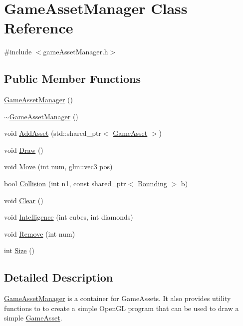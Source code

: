 \hypertarget{classGameAssetManager}{\section{Game\-Asset\-Manager Class Reference}
\label{classGameAssetManager}
}


{\ttfamily \#include $<$game\-Asset\-Manager.\-h$>$}

\subsection*{Public Member Functions}
\begin{DoxyCompactItemize}
\item 
\hyperlink{classGameAssetManager_a84d0445928649e0d1e0f8e31ee137b17}{Game\-Asset\-Manager} ()
\item 
\hyperlink{classGameAssetManager_a1270bd61ecbcca563f079803e40c9b77}{$\sim$\-Game\-Asset\-Manager} ()
\item 
void \hyperlink{classGameAssetManager_ad3de8ff00d55ba04728b1de8213b2349}{Add\-Asset} (std\-::shared\-\_\-ptr$<$ \hyperlink{classGameAsset}{Game\-Asset} $>$)
\item 
void \hyperlink{classGameAssetManager_a32837132bd70a9a9ed537323c2d3d886}{Draw} ()
\item 
void \hyperlink{classGameAssetManager_ac9dfdde0628476af5b77b60d461041f1}{Move} (int num, glm\-::vec3 pos)
\item 
bool \hyperlink{classGameAssetManager_a79e400319fb874ae0301a8b0e7926737}{Collision} (int n1, const shared\-\_\-ptr$<$ \hyperlink{classBounding}{Bounding} $>$ b)
\item 
void \hyperlink{classGameAssetManager_a9c2f2b3bae3f4752be16e850e9c45136}{Clear} ()
\item 
void \hyperlink{classGameAssetManager_ae7e76a05368ce0887ed72a9ee39329eb}{Intelligence} (int cubes, int diamonds)
\item 
void \hyperlink{classGameAssetManager_a2c87c005095eadb1669428dfe3a16423}{Remove} (int num)
\item 
int \hyperlink{classGameAssetManager_ae0e0f79e6dbe422ce5d3c4fd5e20d032}{Size} ()
\end{DoxyCompactItemize}


\subsection{Detailed Description}
\hyperlink{classGameAssetManager}{Game\-Asset\-Manager} is a container for Game\-Assets. It also provides utility functions to to create a simple Open\-G\-L program that can be used to draw a simple \hyperlink{classGameAsset}{Game\-Asset}. 

